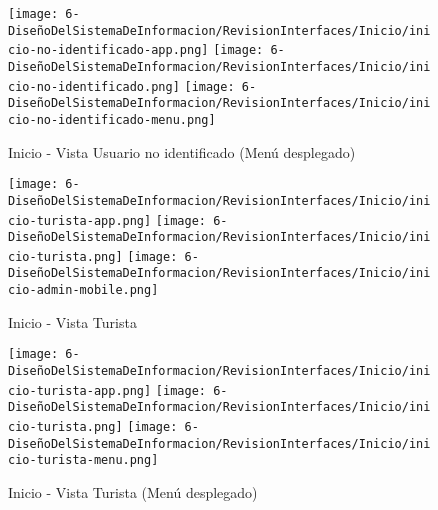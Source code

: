 \begin{figure}[H]
	\centering
	\texttt{[image: 6-DiseñoDelSistemaDeInformacion/RevisionInterfaces/Inicio/inicio-no-identificado-app.png]}
	\texttt{[image: 6-DiseñoDelSistemaDeInformacion/RevisionInterfaces/Inicio/inicio-no-identificado.png]}
	\texttt{[image: 6-DiseñoDelSistemaDeInformacion/RevisionInterfaces/Inicio/inicio-no-identificado-menu.png]}
	\caption{Inicio - Vista Usuario no identificado (Menú desplegado)}
\end{figure}

\begin{figure}[H]
	\centering
	\texttt{[image: 6-DiseñoDelSistemaDeInformacion/RevisionInterfaces/Inicio/inicio-turista-app.png]}
	\texttt{[image: 6-DiseñoDelSistemaDeInformacion/RevisionInterfaces/Inicio/inicio-turista.png]}
	\texttt{[image: 6-DiseñoDelSistemaDeInformacion/RevisionInterfaces/Inicio/inicio-admin-mobile.png]}
	\caption{Inicio - Vista Turista }
\end{figure}

\begin{figure}[H]
	\centering
	\texttt{[image: 6-DiseñoDelSistemaDeInformacion/RevisionInterfaces/Inicio/inicio-turista-app.png]}
	\texttt{[image: 6-DiseñoDelSistemaDeInformacion/RevisionInterfaces/Inicio/inicio-turista.png]}
	\texttt{[image: 6-DiseñoDelSistemaDeInformacion/RevisionInterfaces/Inicio/inicio-turista-menu.png]}
	\caption{Inicio - Vista Turista (Menú desplegado)}
\end{figure}
